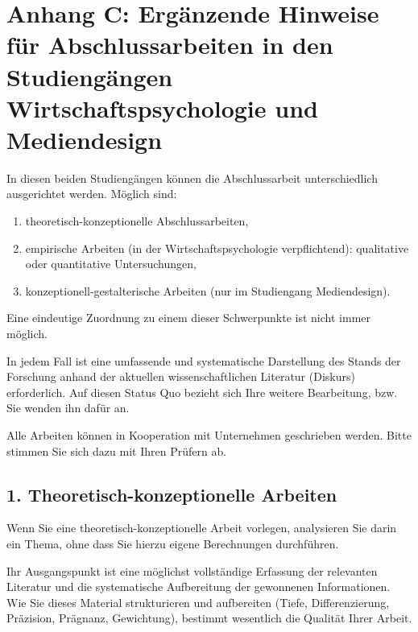 \chapter*{Anhang C: Ergänzende Hinweise für Abschlussarbeiten in den Studiengängen Wirtschaftspsychologie und Mediendesign}
\label{app:wirtschaftspsychologie-mediendesign}

In diesen beiden Studiengängen können die Abschlussarbeit unterschiedlich ausgerichtet werden. Möglich sind:
\begin{enumerate}
\item theoretisch-konzeptionelle Abschlussarbeiten,
\item empirische Arbeiten (in der Wirtschaftspsychologie verpflichtend): qualitative oder quantitative Untersuchungen,
\item konzeptionell-gestalterische Arbeiten (nur im Studiengang Mediendesign).
\end{enumerate}

Eine eindeutige Zuordnung zu einem dieser Schwerpunkte ist nicht immer möglich.

In jedem Fall ist eine umfassende und systematische Darstellung des Stands der Forschung anhand der aktuellen wissenschaftlichen Literatur (Diskurs) erforderlich. Auf diesen Status Quo bezieht sich Ihre weitere Bearbeitung, bzw. Sie wenden ihn dafür an.

Alle Arbeiten können in Kooperation mit Unternehmen geschrieben werden. Bitte stimmen Sie sich dazu mit Ihren Prüfern ab.

\section*{1. Theoretisch-konzeptionelle Arbeiten}

Wenn Sie eine theoretisch-konzeptionelle Arbeit vorlegen, analysieren Sie darin ein Thema, ohne dass Sie hierzu eigene Berechnungen durchführen.

Ihr Ausgangspunkt ist eine möglichst vollständige Erfassung der relevanten Literatur und die systematische Aufbereitung der gewonnenen Informationen. Wie Sie dieses Material strukturieren und aufbereiten (Tiefe, Differenzierung, Präzision, Prägnanz, Gewichtung), bestimmt wesentlich die Qualität Ihrer Arbeit.

